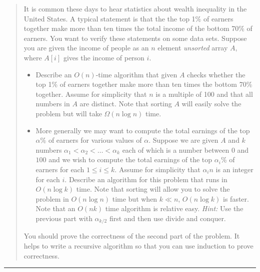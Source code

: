 \documentclass[11pt]{article}
\begin{document}
\begin{quote}
    It is common these days to hear statistics about wealth inequality in
the United States. A typical statement is that the the top 1\% of
earners together make more than ten times the total income of the bottom
70\% of earners. You want to verify these statements on some data
sets. Suppose you are given the income of people as an $n$ element
\emph{unsorted} array $A$, where $A[i]$ gives the income of person
$i$.
\begin{itemize}
\item Describe an $O(n)$-time algorithm that given $A$ checks whether
  the top 1\% of earners together make more than ten times the bottom
  70\% together. Assume for simplicity that $n$ is a multiple of 100
  and that all numbers in $A$ are distinct. Note that sorting $A$ will
  easily solve the problem but will take $\Omega(n\log n)$ time.
\item More generally we may want to compute the total earnings of the
  top $\alpha$\% of earners for various values of $\alpha$. Suppose we
  are given $A$ and $k$ numbers $\alpha_1 < \alpha_2 < \ldots < \alpha_k$
  each of which is a number between $0$ and $100$ and we wish to
  compute the total earnings of the top $\alpha_i$\% of earners for
  each $1 \le i \le k$. Assume for simplicity that $\alpha_i n$ is an
  integer for each $i$. Describe an algorithm for this problem that
  runs in $O(n \log k)$ time. Note that sorting will allow you to
  solve the problem in $O(n \log n)$ time but when $k \ll n$, $O(n
  \log k)$ is faster. Note that an $O(nk)$ time algorithm is relative
  easy. {\em Hint:} Use the previous part with $\alpha_{k/2}$ first and then
  use divide and conquer.
\end{itemize}

You should prove the correctness of the second part of the problem.
It helps to write a recursive algorithm so that you can use induction
to prove correctness.

\end{quote}
\hrule
\end{document}
